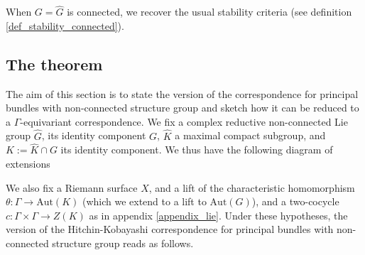 When \(G=\hat{G}\) is connected, we recover the usual stability criteria (see definition \ref{def_stability_connected}).

\subsection{The theorem}
The aim of this section is to state the version of the correspondence for principal bundles with non-connected structure group and sketch how it can be reduced to a \(\Gamma\)-equivariant correspondence. We fix a complex reductive non-connected Lie group \(\hat{G}\), its identity component \(G\), \(\hat{K}\) a maximal compact subgroup, and \(K:=\hat{K}\cap G\) its identity component. We thus have the following diagram of extensions
\begin{center}
\end{center}
We also fix a Riemann surface \(X\), and a lift of the characteristic homomorphism \(\theta\colon \Gamma\to \mathrm{Aut}(K)\) (which we extend to a lift to \(\mathrm{Aut}(G)\)), and a two-cocycle \(c\colon \Gamma \times \Gamma \to Z(K)\) as in appendix \ref{appendix_lie}. Under these hypotheses, the version of the Hitchin-Kobayashi correspondence for principal bundles with non-connected structure group reads as follows.


